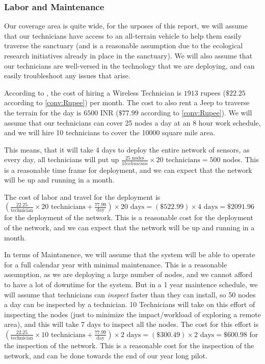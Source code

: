 \subsubsection{Labor and Maintenance}

Our coverage area is quite wide, for the urposes of this report, we will assume that our technicians have access to an all-terrain vehicle to help them easily traverse the sanctuary (and is a reasonable assumption due to the ecological research initiatives already in place in the sanctuary). We will also assume that our technicians are well-versed in the technology that we are deploying, and can easily troubleshoot any issues that arise.

According to \cite{wxkerela}, the cost of hiring a Wireless Technician is $1913$ rupees ($\$22.25$ according to \ref{conv:Rupee}) per month. The cost to also rent a Jeep to traverse the terrain for the day is $6500$ INR \cite{jeeprent} ($\$77.99$ according to \ref{conv:Rupee}). We will assume that our technicians can cover 25 nodes a day at an 8 hour work schedule, and we will hire 10 technicians to cover the 10000 square mile area. 

This means, that it will take 4 days to deploy the entire network of sensors, as every day, all technicians will put up $\frac{25 \text{ nodes}}{ 1 technician} \times 20 \text{ technicians} = 500$ nodes. This is a reasonable time frame for deployment, and we can expect that the network will be up and running in a month.


The cost of labor and travel for the deployment is $(\frac{22.25}{\text{technician}} \times 20 \text{ technicians} + \frac{77.99}{\text{day}}) \times 20 \text{ days} = (\$522.99) \times 4 \text{ days} = \$2091.96$ for the deployment of the network. This is a reasonable cost for the deployment of the network, and we can expect that the network will be up and running in a month. 

In terms of Maintanence, we will assume that the system will be able to operate for a full calendar year with minimal maintenance. This is a reasonable assumption, as we are deploying a large number of nodes, and we cannot afford to have a lot of downtime for the system. But in a 1 year maintence schedule, we will assume that technicians can \textit{inspect} faster than they can install, so 50 nodes a day can be inspected by a technician. 10 Technicians will take on this effort of inspecting the nodes (just to minimize the impact/workload of exploring a remote area), and this will take 7 days to inspect all the nodes. The cost for this effort is $(\frac{22.25}{\text{technician}} \times 10 \text{ technicians} + \frac{77.99}{\text{day}}) \times 2 \text{ days} = (\$300.49) \times 2 \text{ days} = \$600.98$ for the inspection of the network. This is a reasonable cost for the inspection of the network, and can be done towards the end of our year long pilot. 

